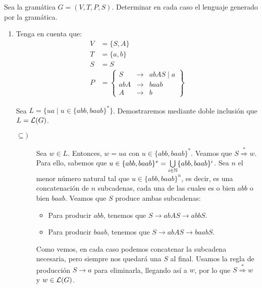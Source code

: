 \begin{ejercicio} \label{ej:1.2}
    Sea la gramática $G=\left(V,T,P,S\right)$. Determinar en cada caso el lenguaje generado por la gramática.
    \begin{enumerate}
        \item Tenga en cuenta que:
        \begin{align*}
            V &= \{S,A\}\\
            T &= \{a,b\}\\
            S &= S \\
            P &= \left\{
                \begin{array}{rcl}
                    S &\rightarrow & abAS \mid a \\
                    abA &\rightarrow & baab \\
                    A &\rightarrow & b
                \end{array}
            \right\}
        \end{align*}

        Sea $L=\{ua \mid u\in \{abb, baab\}^\ast\}$. Demostraremos mediante doble inclusión que $L=\mathcal{L}(G)$.
        \begin{description}
            \item[$\subseteq)$] Sea $w\in L$. Entonces, $w=ua$ con $u\in \{abb, baab\}^\ast$. Veamos que
            $S \stackrel{\ast}{\Longrightarrow} w$. Para ello, sabemos que $u\in \{abb, baab\}^\ast=\bigcup\limits_{i\in \mathbb{N}} \{abb, baab\}^i$.
            Sea $n$ el menor número natural tal que $u\in \{abb, baab\}^n$, es decir, es una concatenación de $n$ subcadenas, cada una de las cuales es o bien $abb$ o bien $baab$. Veamos que $S$ produce ambas subcadenas:
            \begin{itemize}
                \item Para producir $abb$, tenemos que $S\rightarrow abAS \rightarrow abbS$.
                \item Para producir $baab$, tenemos que $S\rightarrow abAS \rightarrow baabS$.
            \end{itemize}
            Como vemos, en cada caso podemos concatenar la subcadena necesaria, pero siempre nos quedará una $S$ al final. Usamos la regla de producción $S\rightarrow a$ para eliminarla, llegando así a $w$, por lo que $S \stackrel{\ast}{\Longrightarrow} w$ y $w\in \mathcal{L}(G)$.


\end{description}
\end{enumerate}
\end{ejercicio}
